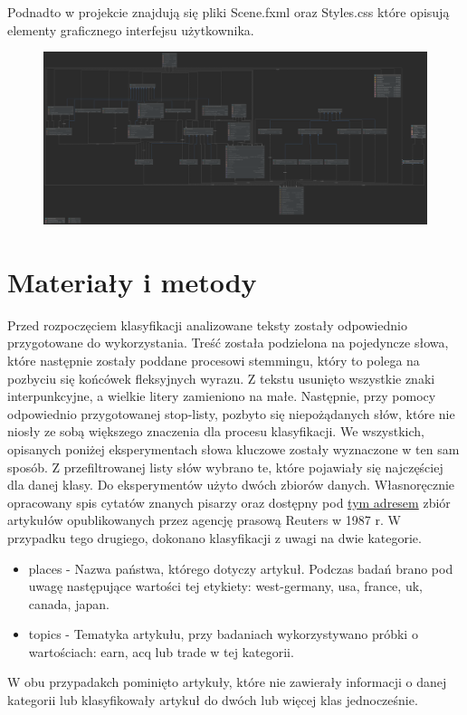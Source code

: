 \documentclass{classrep}
\begin{document}
Podnadto w projekcie znajdują się pliki Scene.fxml oraz Styles.css które opisują elementy graficznego interfejsu użytkownika.

\begin{center}
	\begin{figure}[H]
		\advance\leftskip-3.65cm
		\includegraphics[width=\paperwidth]{ksr_uml}
	\end{figure}
\end{center}


\section{Materiały i metody}
Przed rozpoczęciem klasyfikacji analizowane teksty zostały odpowiednio przygotowane do wykorzystania. Treść została podzielona na pojedyncze słowa, które następnie zostały poddane procesowi stemmingu, który to polega na pozbyciu się końcówek fleksyjnych wyrazu. Z tekstu usunięto wszystkie znaki interpunkcyjne, a wielkie litery zamieniono na małe. Następnie, przy pomocy odpowiednio przygotowanej stop-listy, pozbyto się niepożądanych słów, które nie niosły ze sobą większego znaczenia dla procesu klasyfikacji.
We wszystkich, opisanych poniżej eksperymentach słowa kluczowe zostały wyznaczone w ten sam sposób. Z przefiltrowanej listy słów wybrano te, które pojawiały się najczęściej dla danej klasy. 
Do eksperymentów użyto dwóch zbiorów danych. Własnoręcznie opracowany spis cytatów znanych pisarzy oraz dostępny pod \href{http://archive.ics.uci.edu/ml/datasets/Reuters-21578+Text+Categorization+Collection}{tym adresem} zbiór artykułów opublikowanych przez agencję prasową Reuters w 1987 r. W przypadku tego drugiego, dokonano klasyfikacji z uwagi na dwie kategorie.
\begin{itemize}
	\item places - Nazwa państwa, którego dotyczy artykuł. Podczas badań brano pod uwagę następujące wartości tej etykiety: west-germany, usa, france, uk, canada, japan.
	\item topics - Tematyka artykułu, przy badaniach wykorzystywano próbki o wartościach: earn, acq lub trade w tej kategorii.
\end{itemize}
W obu przypadakch pominięto artykuły, które nie zawierały informacji o danej kategorii lub klasyfikowały artykuł do dwóch lub więcej klas jednocześnie.
\end{document}

